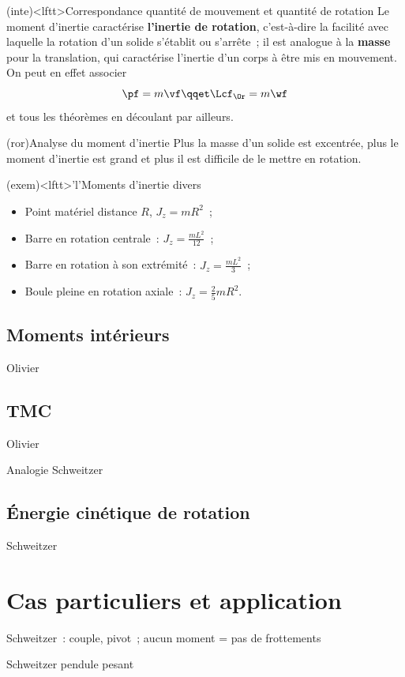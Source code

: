 \documentclass[../../main/main.tex]{subfiles}
\begin{document}
\begin{tcb*}(inte)<lftt>{Correspondance quantité de mouvement et quantité de rotation}
Le moment d'inertie caractérise \textbf{l'inertie de rotation}, c'est-à-dire
la facilité avec laquelle la rotation d'un solide s'établit ou s'arrête~; il
est analogue à la \textbf{masse} pour la translation, qui caractérise
l'inertie d'un corps à être mis en mouvement. On peut en effet associer
	\[
		\pf = m\vf
		\qqet
		\Lcf_{\Or} = m\wf
	\]
	et tous les théorèmes en découlant par ailleurs.
\end{tcb*}

\begin{tcb*}(ror){Analyse du moment d'inertie}
	Plus la masse d'un solide est excentrée, plus le moment d'inertie
	est grand et plus il est difficile de le mettre en rotation.
\end{tcb*}

\begin{tcb*}(exem)<lftt>'l'{Moments d'inertie divers}
	\begin{itemize}
		\item Point matériel distance $R$, $J_z = mR^2$~;
		\item Barre en rotation centrale~: $J_z = \frac{mL^2}{12}$~;
		\item Barre en rotation à son extrémité~: $J_z = \frac{mL^2}{3}$~;
		\item Boule pleine en rotation axiale~: $J_z = \frac{2}{5}mR^2$.
	\end{itemize}
\end{tcb*}
\subsection{Moments intérieurs}
Olivier

\subsection{TMC}
Olivier

Analogie Schweitzer

\subsection{Énergie cinétique de rotation}
Schweitzer

\section{Cas particuliers et application}
Schweitzer~: couple, pivot~; aucun moment = pas de frottements

Schweitzer pendule pesant
\end{document}
